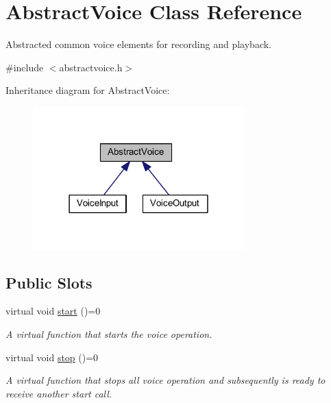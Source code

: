 \hypertarget{class_abstract_voice}{
\section{\-Abstract\-Voice \-Class \-Reference}
\label{class_abstract_voice}
}


\-Abstracted common voice elements for recording and playback.  




{\ttfamily \#include $<$abstractvoice.\-h$>$}



\-Inheritance diagram for \-Abstract\-Voice\-:\nopagebreak
\begin{figure}[H]
\begin{center}
\leavevmode
\includegraphics[width=231pt]{class_abstract_voice__inherit__graph}
\end{center}
\end{figure}
\subsection*{\-Public \-Slots}
\begin{DoxyCompactItemize}
\item 
virtual void \hyperlink{class_abstract_voice_a5e6f942915e9ef55babd7070225266ce}{start} ()=0
\begin{DoxyCompactList}\small\item\em \-A virtual function that starts the voice operation. \end{DoxyCompactList}\item 
virtual void \hyperlink{class_abstract_voice_aae2a6c918a63938881faefd9909508a0}{stop} ()=0
\begin{DoxyCompactList}\small\item\em \-A virtual function that stops all voice operation and subsequently is ready to receive another start call. \end{DoxyCompactList}\end{DoxyCompactItemize}
